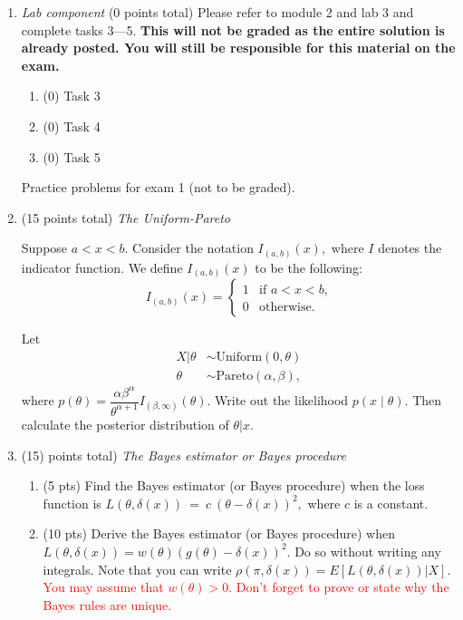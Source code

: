 \documentclass{article}
\begin{document}
\begin{enumerate}
\item {\em Lab component} 
  (0 points total) Please refer to module 2 and lab 3 and complete tasks 3---5. \textbf{This will not be graded as the entire solution is already posted. You will still be responsible for this material on the exam.}
  \begin{enumerate}
  \item (0) Task 3
  \item (0) Task 4
  \item (0) Task 5
  \end{enumerate}
  
  \newpage
  
Practice problems for exam 1 (not to be graded).   
  
\item (15 points total) {\em The Uniform-Pareto}

Suppose $a < x < b.$ Consider the notation
$I_{(a,b)}(x),$ where $I$ denotes the indicator function. We define $I_{(a,b)}(x)$ to be the following:
$$
I_{(a,b)}(x)=
\begin{cases} 
1 & \text{if $a < x < b$,}
\\
0 &\text{otherwise.}
\end{cases}
$$

Let 
\begin{align*}
X|\theta &\sim \text{Uniform}(0,\theta)\\
\theta &\sim \text{Pareto}(\alpha,\beta),
\end{align*}
where $p(\theta) = \dfrac{\alpha \beta^\alpha}{\theta^{\alpha +1}}I_{(\beta,\infty)}(\theta).$
Write out the likelihood $p(x\mid \theta).$ Then calculate the posterior distribution of $\theta|x.$  
  
  
\item (15)  points total) {\em The Bayes estimator or Bayes procedure}
\begin{enumerate}
\item (5 pts) Find the Bayes estimator (or Bayes procedure) when the loss function is  $L(\theta, \delta(x))~=~c~(\theta-\delta(x))^2,$ where $c$ is a constant. 
\item (10 pts) Derive the Bayes estimator (or Bayes procedure) when $L(\theta, \delta(x)) = w(\theta) (g(\theta)-\delta(x))^2.$ Do so without writing any integrals. Note that you can write $\rho(\pi,\delta(x)) =  E[L(\theta,\delta(x))|X].$  \textcolor{red}{You may assume that $w(\theta) > 0.$} \textcolor{red}{Don't forget to prove or state why the Bayes rules are unique.}
\end{enumerate}


\end{enumerate}
\end{document}
